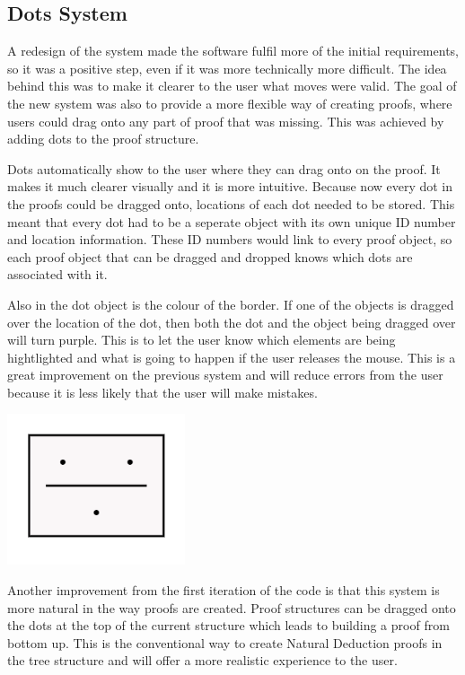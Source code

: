 \subsection{Dots System}

A redesign of the system made the software fulfil more of the initial requirements, so it was a positive step, even if it was more technically more difficult. The idea behind this was to make it clearer to the user what moves were valid. The goal of the new system was also to provide a more flexible way of creating proofs, where users could drag onto any part of proof that was missing. This was achieved by adding dots to the proof structure.

Dots automatically show to the user where they can drag onto on the proof. It makes it much clearer visually and it is more intuitive. Because now every dot in the proofs could be dragged onto, locations of each dot needed to be stored. This meant that every dot had to be a seperate object with its own unique ID number and location information. These ID numbers would link to every proof object, so each proof object that can be dragged and dropped knows which dots are associated with it.

Also in the dot object is the colour of the border. If one of the objects is dragged over the location of the dot, then both the dot and the object being dragged over will turn purple. This is to let the user know which elements are being hightlighted and what is going to happen if the user releases the mouse. This is a great improvement on the previous system and will reduce errors from the user because it is less likely that the user will make mistakes.  

\centerline{\includegraphics[scale=0.5]{dots}}

Another improvement from the first iteration of the code is that this system is more natural in the way proofs are created. Proof structures can be dragged onto the dots at the top of the current structure which leads to building a proof from bottom up. This is the conventional way to create Natural Deduction proofs in the tree structure and will offer a more realistic experience to the user.

